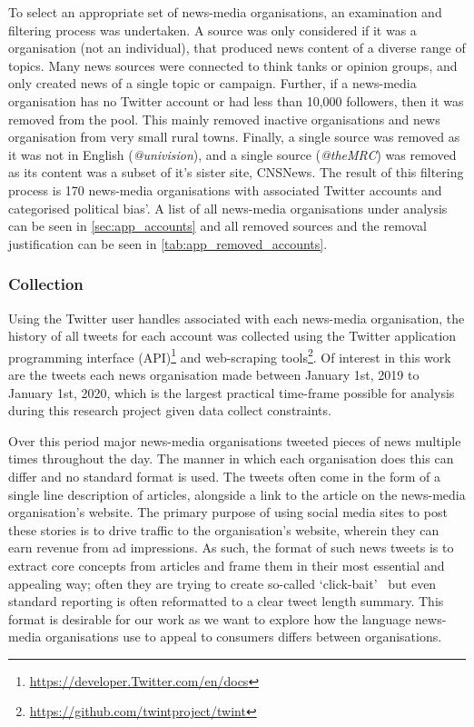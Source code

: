To select an appropriate set of news-media organisations, an examination and filtering process was undertaken. A source was only considered if it was a organisation (not an individual), that produced news content of a diverse range of topics. Many news sources were connected to think tanks or opinion groups, and only created news of a single topic or campaign. Further, if a news-media organisation has no Twitter account or had less than 10,000 followers, then it was removed from the pool. This mainly removed inactive organisations and news organisation from very small rural towns. 
Finally, a single source was removed as it was not in English (\emph{@univision}), and a single source (\emph{@theMRC}) was removed as its content was a subset of it's sister site, CNSNews.  The result of this filtering process is 170 news-media organisations with associated Twitter accounts and categorised political bias'.  A list of all news-media organisations under analysis can be seen in \autoref{sec:app_accounts} and all removed sources and the removal justification can be seen in \autoref{tab:app_removed_accounts}.

\subsubsection{Collection}
Using the Twitter user handles associated with each news-media organisation, the history of all tweets for each account was collected using the Twitter application programming interface (API)\footnote{\url{https://developer.Twitter.com/en/docs}} and web-scraping tools\footnote{\url{https://github.com/twintproject/twint}}. Of interest in this work are the tweets each news organisation made between January 1st, 2019 to January 1st, 2020, which is the largest practical time-frame possible for analysis during this research project given data collect constraints. 

Over this period major news-media organisations tweeted pieces of news multiple times throughout the day. The manner in which each organisation does this can differ and no standard format is used. The tweets often come in the form of a single line description of articles, alongside a link to the article on the news-media organisation's website. The primary purpose of using social media sites to post these stories is to drive traffic to the organisation's website, wherein they can earn revenue from ad impressions. As such, the format of such news tweets is to extract core concepts from articles and frame them in their most essential and appealing way; often they are trying to create so-called `click-bait'~\cite{potthastCrowdsourcingLargeCorpus2018} but even standard reporting is often reformatted to a clear tweet length summary. This format is desirable for our work as we want to explore how the language news-media organisations use to appeal to consumers differs between organisations.

